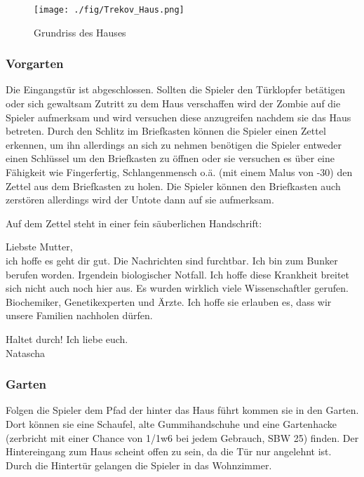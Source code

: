 \documentclass{include/protokollclass}
\begin{document}
\begin{figure}[ht]
	\begin{center}
		\texttt{[image: ./fig/Trekov\_Haus.png]}
		\caption{Grundriss des Hauses}
	\end{center}
\end{figure}

\subsubsection{Vorgarten}

Die Eingangstür ist abgeschlossen. Sollten die Spieler den Türklopfer betätigen oder sich gewaltsam Zutritt zu dem Haus verschaffen wird der Zombie auf die Spieler aufmerksam und wird versuchen diese anzugreifen nachdem sie das Haus betreten. Durch den Schlitz im Briefkasten können die Spieler einen Zettel erkennen, um ihn allerdings an sich zu nehmen benötigen die Spieler entweder einen Schlüssel um den Briefkasten zu öffnen oder sie versuchen es über eine Fähigkeit wie Fingerfertig, Schlangenmensch o.ä. (mit einem Malus von -30) den Zettel aus dem Briefkasten zu holen. Die Spieler können den Briefkasten auch zerstören allerdings wird der Untote dann auf sie aufmerksam.

Auf dem Zettel steht in einer fein säuberlichen Handschrift:

\begin{itshape}
Liebste Mutter,
\\ich hoffe es geht dir gut. Die Nachrichten sind furchtbar. Ich bin zum Bunker berufen worden. Irgendein biologischer Notfall. Ich hoffe diese Krankheit breitet sich nicht auch noch hier aus. Es wurden wirklich viele Wissenschaftler gerufen. Biochemiker, Genetikexperten und Ärzte. Ich hoffe sie erlauben es, dass wir unsere Familien nachholen dürfen.

Haltet durch! Ich liebe euch.
\\Natascha
\end{itshape}

\subsubsection{Garten}

Folgen die Spieler dem Pfad der hinter das Haus führt kommen sie in den Garten. Dort können sie eine Schaufel, alte Gummihandschuhe und eine Gartenhacke (zerbricht mit einer Chance von 1/1w6 bei jedem Gebrauch, SBW 25) finden. Der Hintereingang zum Haus scheint offen zu sein, da die Tür nur angelehnt ist. Durch die Hintertür gelangen die Spieler in das Wohnzimmer.
\end{document}

